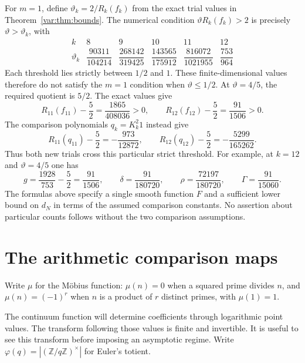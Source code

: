 \documentclass[11pt]{article}
\begin{document}
For $m=1$, define $\vartheta_k=2/R_k(f_k)$ from the exact trial values in
Theorem~\ref{var:thm:bounds}.
The numerical condition $\vartheta R_k(f_k)>2$ is precisely
$\vartheta>\vartheta_k$, with
\begin{equation}\label{bridge:eq:theta-table}
\begin{array}{c|ccccc}
 k&8&9&10&11&12\\ \hline
 \vartheta_k&\dfrac{90311}{104214}&\dfrac{268142}{319425}&
 \dfrac{143565}{175912}&\dfrac{816072}{1021955}&\dfrac{753}{964}
\end{array}
\end{equation}
Each threshold lies strictly between $1/2$ and $1$.
These finite-dimensional values therefore do not satisfy the $m=1$
condition when $\vartheta\leq1/2$.
At $\vartheta=4/5$, the required quotient is $5/2$.
The exact values give
\[
 R_{11}(f_{11})-\frac52=\frac{1865}{408036}>0,\qquad
 R_{12}(f_{12})-\frac52=\frac{91}{1506}>0.
\]
The comparison polynomials $q_k=K_k^2 1$ instead give
\[
 R_{11}(q_{11})-\frac52=-\frac{973}{12872},\qquad
 R_{12}(q_{12})-\frac52=-\frac{5299}{165262}.
\]
Thus both new trials cross this particular strict threshold.
For example, at $k=12$ and $\vartheta=4/5$ one has
\[
 g=\frac{1928}{753}-\frac52=\frac{91}{1506},\qquad
 \delta=\frac{91}{180720},\qquad
 \rho=\frac{72197}{180720},\qquad
 \Gamma=\frac{91}{15060}.
\]
The formulas above specify a single smooth function $F$ and a sufficient
lower bound on $d_N$ in terms of the assumed comparison constants.
No assertion about particular counts follows without the two comparison
assumptions.

\section{The arithmetic comparison maps}

Write $\mu$ for the M\"obius function: $\mu(n)=0$ when a squared prime
divides $n$, and $\mu(n)=(-1)^r$ when $n$ is a product of $r$ distinct
primes, with $\mu(1)=1$.


The continuum function will determine coefficients through logarithmic
point values.  The transform following those values is finite and invertible.
It is useful to see this transform before imposing an asymptotic regime.
Write $\varphi(q)=|(\mathbb Z/q\mathbb Z)^\times|$ for Euler's totient.
\end{document}
